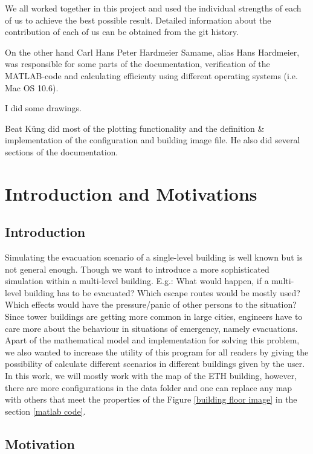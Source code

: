 \documentclass[11pt]{article}
\begin{document}
We all worked together in this project and used the individual strengths of each
of us to achieve the best possible result. Detailed information about the
contribution of each of us can be obtained from the git history.

On the other hand Carl Hans Peter Hardmeier Samame, alias Hans Hardmeier, was responsible for some parts of the documentation, verification of the MATLAB-code and calculating efficienty using different operating systems (i.e. Mac OS 10.6).

I did some drawings.


Beat K\"ung did most of the plotting functionality and the definition \&
implementation of the configuration and building image file. He also did several
sections of the documentation.




\section{Introduction and Motivations}

\subsection{Introduction}

Simulating the evacuation scenario of a single-level building is well known but
is not general enough. Though we want to introduce a more sophisticated
simulation within a multi-level building. E.g.: What would happen, if a
multi-level building has to be evacuated? Which escape routes would be mostly
used? Which effects would have the pressure/panic of other persons to the
situation? Since tower buildings are getting more common in large cities,
engineers have to care more about the behaviour in situations of emergency,
namely evacuations. Apart of the mathematical model and implementation for
solving this problem, we also wanted to increase the utility of this program for
all readers by giving the possibility of calculate different scenarios in
different buildings given by the user. In this work, we will mostly work with
the map of the ETH building, however, there are more configurations in the data
folder and one can replace any map with others that meet the properties of the
Figure \ref{building floor image} in the section \ref{matlab code}.

\subsection{Motivation}
\end{document}

